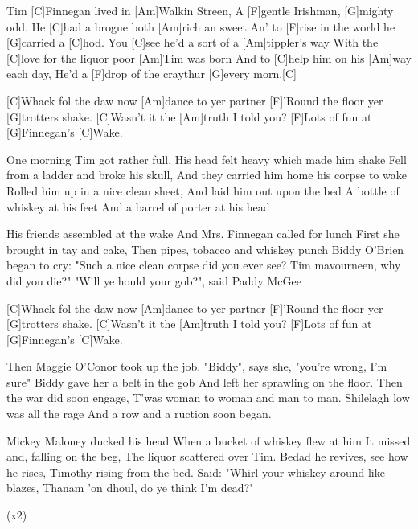 

\begin{guitar}
	Tim [C]Finnegan lived in [Am]Walkin Streen,
	A [F]gentle Irishman, [G]mighty odd.
	He [C]had a brogue both [Am]rich an sweet
	An' to [F]rise in the world he [G]carried a [C]hod.
	You [C]see he'd a sort of a [Am]tippler's way 
	With the [C]love for the liquor poor [Am]Tim was born
	And to [C]help him on his [Am]way each day, 
	He'd a [F]drop of the craythur [G]every morn.[C]{}
	
  \smallskip
	[C]Whack fol the daw now [Am]dance to yer partner
	[F]'Round the floor yer [G]trotters shake.
	[C]Wasn't it the [Am]truth I told you?
	[F]Lots of fun at [G]Finnegan's [C]Wake.
	
	One morning Tim got rather full,
	His head felt heavy which made him shake
	Fell from a ladder and broke his skull,
	And they carried him home his corpse to wake
	Rolled him up in a nice clean sheet, 
	And laid him out upon the bed
	A bottle of whiskey at his feet 
	And a barrel of porter at his head
	
	 
	
	\pagebreak
	
	His friends assembled at the wake 
	And Mrs. Finnegan called for lunch
	First she brought in tay and cake, 
	Then pipes, tobacco and whiskey punch
	Biddy O'Brien began to cry: 
	"Such a nice clean corpse did you ever see?
	Tim mavourneen, why did you die?" 
	"Will ye hould your gob?", said Paddy McGee
	
  \smallskip
	[C]Whack fol the daw now [Am]dance to yer partner
	[F]'Round the floor yer [G]trotters shake.
	[C]Wasn't it the [Am]truth I told you?
	[F]Lots of fun at [G]Finnegan's [C]Wake.
	
	Then Maggie O'Conor took up the job. 
	"Biddy", says she, "you're wrong, I'm sure"
	Biddy gave her a belt in the gob 
	And left her sprawling on the floor.
	Then the war did soon engage, 
	T'was woman to woman and man to man.
	Shilelagh low was all the rage 
	And a row and a ruction soon began.
	
	 
	
	Mickey Maloney ducked his head 
	When a bucket of whiskey flew at him
	It missed and, falling on the beg,
	The liquor scattered over Tim.
	Bedad he revives, see how he rises,
	Timothy rising from the bed.
	Said: "Whirl your whiskey around like blazes, 
	Thanam 'on dhoul, do ye think I'm dead?"
	
	  (x2)
\end{guitar}
